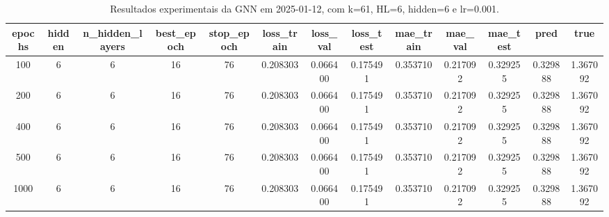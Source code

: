 \begin{table}[h]
\centering
\caption{Resultados experimentais da GNN em 2025-01-12, com k=61, HL=6, hidden=6 e lr=0.001.}
\label{tab:gnn_results_k61_hl6_h6_d20250112}
\begin{tabular}{ccccccccccccc}
\toprule
epochs & hidden & n\_hidden\_layers & best\_epoch & stop\_epoch & loss\_train & loss\_val & loss\_test & mae\_train & mae\_val & mae\_test & pred & true \\
\midrule
100 & 6 & 6 & 16 & 76 & 0.208303 & 0.066400 & 0.175491 & 0.353710 & 0.217092 & 0.329255 & 0.329888 & 1.367092 \\
200 & 6 & 6 & 16 & 76 & 0.208303 & 0.066400 & 0.175491 & 0.353710 & 0.217092 & 0.329255 & 0.329888 & 1.367092 \\
400 & 6 & 6 & 16 & 76 & 0.208303 & 0.066400 & 0.175491 & 0.353710 & 0.217092 & 0.329255 & 0.329888 & 1.367092 \\
500 & 6 & 6 & 16 & 76 & 0.208303 & 0.066400 & 0.175491 & 0.353710 & 0.217092 & 0.329255 & 0.329888 & 1.367092 \\
1000 & 6 & 6 & 16 & 76 & 0.208303 & 0.066400 & 0.175491 & 0.353710 & 0.217092 & 0.329255 & 0.329888 & 1.367092 \\
\bottomrule
\end{tabular}
\end{table}

